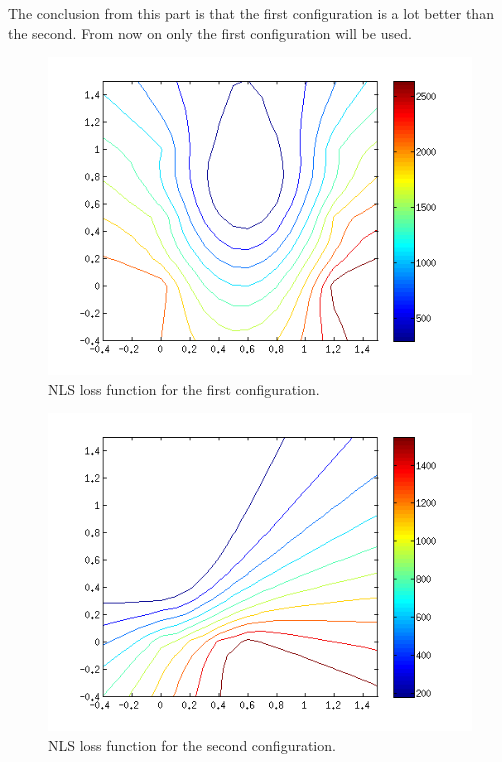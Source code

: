 \documentclass[10pt,a4paper]{report}
\begin{document}
The conclusion from this part is that the first configuration is a lot better than the second.
From now on only the first configuration will be used.

\begin{figure}[H]
\begin{center}
  \includegraphics[width = 350pt]{nls_good.png}
  \caption{NLS loss function for the first configuration.}
  \label{nls_good}
  \end{center}
\end{figure}

\begin{figure}[H]
\begin{center}
  \includegraphics[width = 350pt]{nls_bad.png}
  \caption{NLS loss function for the second configuration.}
  \label{nls_bad}
  \end{center}
\end{figure}
\end{document}
